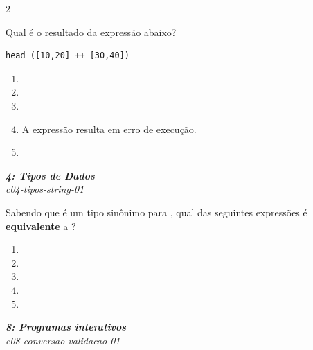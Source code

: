\documentclass[a4paper,10pt,brazil]{article}
\begin{document}
\begin{multicols}{2}
\begin{flushright}
\end{flushright}
Qual é o resultado da expressão abaixo?
\begin{verbatim}
head ([10,20] ++ [30,40])
\end{verbatim}

\begin{enumerate}
  \item {}

  \item {}

  \item {}

  \item A expressão resulta em erro de execução.

  \item \haskellinline{ [10,20] }


\end{enumerate}

\begin{flushright}
  \footnotesize
  \textit{\textbf{4: Tipos de Dados}}\\
  \textit{c04-tipos-string-01}\\

\end{flushright}
Sabendo que  é um tipo sinônimo para \haskellinline{[Char]}, qual das seguintes expressões é \textbf{equivalente} a ?

\begin{enumerate}
  \item {}

  \item {}

  \item \haskellinline{['F', 'P']}

  \item {}

  \item \haskellinline{["F", "P"]}


\end{enumerate}

\begin{flushright}
  \footnotesize
  \textit{\textbf{8: Programas interativos}}\\
  \textit{c08-conversao-validacao-01}\\


\end{flushright}
\end{multicols}
\end{document}

